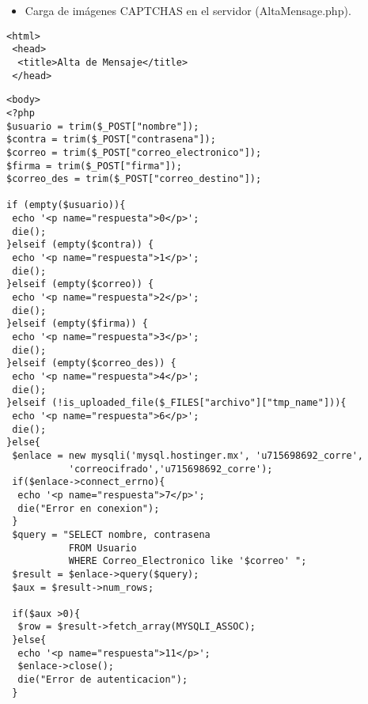 \begin{itemize}
\item Carga de imágenes CAPTCHAS en el servidor (AltaMensage.php).
\end{itemize}

 \begin{lstlisting}[frame=single]
 <html>
 <head>
  <title>Alta de Mensaje</title> 
 </head>
\end{lstlisting}
\begin{lstlisting}[frame=single]
 <body>
<?php
$usuario = trim($_POST["nombre"]);
$contra = trim($_POST["contrasena"]);
$correo = trim($_POST["correo_electronico"]);
$firma = trim($_POST["firma"]);
$correo_des = trim($_POST["correo_destino"]);

if (empty($usuario)){
 echo '<p name="respuesta">0</p>';
 die();
}elseif (empty($contra)) {
 echo '<p name="respuesta">1</p>';
 die();
}elseif (empty($correo)) {
 echo '<p name="respuesta">2</p>';
 die();
}elseif (empty($firma)) {
 echo '<p name="respuesta">3</p>';
 die();
}elseif (empty($correo_des)) {
 echo '<p name="respuesta">4</p>';
 die();
}elseif (!is_uploaded_file($_FILES["archivo"]["tmp_name"])){
 echo '<p name="respuesta">6</p>';
 die();
}else{
 $enlace = new mysqli('mysql.hostinger.mx', 'u715698692_corre', 
           'correocifrado','u715698692_corre');
 if($enlace->connect_errno){
  echo '<p name="respuesta">7</p>';
  die("Error en conexion");
 }
 $query = "SELECT nombre, contrasena 
           FROM Usuario 
           WHERE Correo_Electronico like '$correo' ";
 $result = $enlace->query($query);
 $aux = $result->num_rows;
 
 if($aux >0){
  $row = $result->fetch_array(MYSQLI_ASSOC);
 }else{
  echo '<p name="respuesta">11</p>';
  $enlace->close();
  die("Error de autenticacion");
 }
\end{lstlisting}

